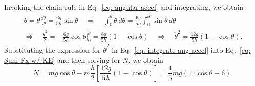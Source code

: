 Invoking the chain rule in Eq.~\eqref{eq: angular accel} and integrating, we obtain
\begin{multline}
\label{eq: integrate ang accel}
\ddot{\theta} = \dot{\theta} \frac{d\dot{\theta}}{d\theta} = \frac{6g}{5h} \sin\theta
\quad \Rightarrow \quad
\int_0^{\dot{\theta}} \dot{\theta} \, d\dot{\theta} = \frac{6g}{5h} \int_0^\theta \sin\theta \,d\theta \\
\Rightarrow \quad
\frac{\dot{\theta}^2}{2} = -\frac{6g}{5h} \cos\theta \biggr|_0^\theta = \frac{6g}{5h} \left( 1 - \cos\theta \right)
\quad \Rightarrow \quad
\dot{\theta}^2 = \frac{12g}{5h} \left( 1 - \cos\theta \right).
\end{multline}
Substituting the expression for $\dot{\theta}^2$ in  Eq.~\eqref{eq: integrate ang accel} into Eq.~\eqref{eq: Sum Fx w/ KE} and then solving for $N$, we obtain
\begin{equation}
\label{eq: N(theta)}
N = mg \cos\theta - m \frac{h}{2} \left[ \frac{12g}{5h} \left( 1 - \cos\theta \right) \right] = \frac{1}{5} mg \left( 11 \cos\theta - 6 \right).
\end{equation}

